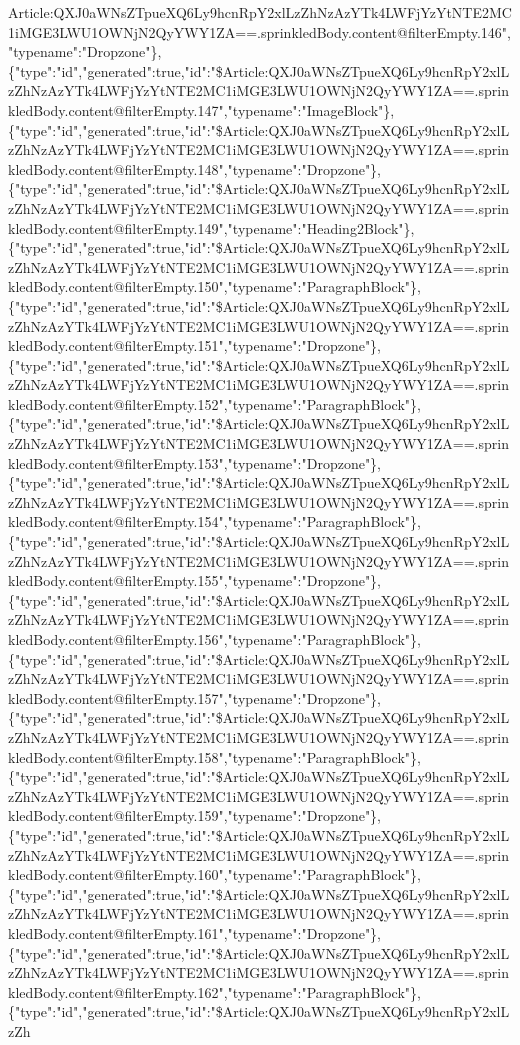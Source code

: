 Article:QXJ0aWNsZTpueXQ6Ly9hcnRpY2xlLzZhNzAzYTk4LWFjYzYtNTE2MC1iMGE3LWU1OWNjN2QyYWY1ZA==.sprinkledBody.content@filterEmpty.146","typename":"Dropzone"\},\{"type":"id","generated":true,"id":"\$Article:QXJ0aWNsZTpueXQ6Ly9hcnRpY2xlLzZhNzAzYTk4LWFjYzYtNTE2MC1iMGE3LWU1OWNjN2QyYWY1ZA==.sprinkledBody.content@filterEmpty.147","typename":"ImageBlock"\},\{"type":"id","generated":true,"id":"\$Article:QXJ0aWNsZTpueXQ6Ly9hcnRpY2xlLzZhNzAzYTk4LWFjYzYtNTE2MC1iMGE3LWU1OWNjN2QyYWY1ZA==.sprinkledBody.content@filterEmpty.148","typename":"Dropzone"\},\{"type":"id","generated":true,"id":"\$Article:QXJ0aWNsZTpueXQ6Ly9hcnRpY2xlLzZhNzAzYTk4LWFjYzYtNTE2MC1iMGE3LWU1OWNjN2QyYWY1ZA==.sprinkledBody.content@filterEmpty.149","typename":"Heading2Block"\},\{"type":"id","generated":true,"id":"\$Article:QXJ0aWNsZTpueXQ6Ly9hcnRpY2xlLzZhNzAzYTk4LWFjYzYtNTE2MC1iMGE3LWU1OWNjN2QyYWY1ZA==.sprinkledBody.content@filterEmpty.150","typename":"ParagraphBlock"\},\{"type":"id","generated":true,"id":"\$Article:QXJ0aWNsZTpueXQ6Ly9hcnRpY2xlLzZhNzAzYTk4LWFjYzYtNTE2MC1iMGE3LWU1OWNjN2QyYWY1ZA==.sprinkledBody.content@filterEmpty.151","typename":"Dropzone"\},\{"type":"id","generated":true,"id":"\$Article:QXJ0aWNsZTpueXQ6Ly9hcnRpY2xlLzZhNzAzYTk4LWFjYzYtNTE2MC1iMGE3LWU1OWNjN2QyYWY1ZA==.sprinkledBody.content@filterEmpty.152","typename":"ParagraphBlock"\},\{"type":"id","generated":true,"id":"\$Article:QXJ0aWNsZTpueXQ6Ly9hcnRpY2xlLzZhNzAzYTk4LWFjYzYtNTE2MC1iMGE3LWU1OWNjN2QyYWY1ZA==.sprinkledBody.content@filterEmpty.153","typename":"Dropzone"\},\{"type":"id","generated":true,"id":"\$Article:QXJ0aWNsZTpueXQ6Ly9hcnRpY2xlLzZhNzAzYTk4LWFjYzYtNTE2MC1iMGE3LWU1OWNjN2QyYWY1ZA==.sprinkledBody.content@filterEmpty.154","typename":"ParagraphBlock"\},\{"type":"id","generated":true,"id":"\$Article:QXJ0aWNsZTpueXQ6Ly9hcnRpY2xlLzZhNzAzYTk4LWFjYzYtNTE2MC1iMGE3LWU1OWNjN2QyYWY1ZA==.sprinkledBody.content@filterEmpty.155","typename":"Dropzone"\},\{"type":"id","generated":true,"id":"\$Article:QXJ0aWNsZTpueXQ6Ly9hcnRpY2xlLzZhNzAzYTk4LWFjYzYtNTE2MC1iMGE3LWU1OWNjN2QyYWY1ZA==.sprinkledBody.content@filterEmpty.156","typename":"ParagraphBlock"\},\{"type":"id","generated":true,"id":"\$Article:QXJ0aWNsZTpueXQ6Ly9hcnRpY2xlLzZhNzAzYTk4LWFjYzYtNTE2MC1iMGE3LWU1OWNjN2QyYWY1ZA==.sprinkledBody.content@filterEmpty.157","typename":"Dropzone"\},\{"type":"id","generated":true,"id":"\$Article:QXJ0aWNsZTpueXQ6Ly9hcnRpY2xlLzZhNzAzYTk4LWFjYzYtNTE2MC1iMGE3LWU1OWNjN2QyYWY1ZA==.sprinkledBody.content@filterEmpty.158","typename":"ParagraphBlock"\},\{"type":"id","generated":true,"id":"\$Article:QXJ0aWNsZTpueXQ6Ly9hcnRpY2xlLzZhNzAzYTk4LWFjYzYtNTE2MC1iMGE3LWU1OWNjN2QyYWY1ZA==.sprinkledBody.content@filterEmpty.159","typename":"Dropzone"\},\{"type":"id","generated":true,"id":"\$Article:QXJ0aWNsZTpueXQ6Ly9hcnRpY2xlLzZhNzAzYTk4LWFjYzYtNTE2MC1iMGE3LWU1OWNjN2QyYWY1ZA==.sprinkledBody.content@filterEmpty.160","typename":"ParagraphBlock"\},\{"type":"id","generated":true,"id":"\$Article:QXJ0aWNsZTpueXQ6Ly9hcnRpY2xlLzZhNzAzYTk4LWFjYzYtNTE2MC1iMGE3LWU1OWNjN2QyYWY1ZA==.sprinkledBody.content@filterEmpty.161","typename":"Dropzone"\},\{"type":"id","generated":true,"id":"\$Article:QXJ0aWNsZTpueXQ6Ly9hcnRpY2xlLzZhNzAzYTk4LWFjYzYtNTE2MC1iMGE3LWU1OWNjN2QyYWY1ZA==.sprinkledBody.content@filterEmpty.162","typename":"ParagraphBlock"\},\{"type":"id","generated":true,"id":"\$Article:QXJ0aWNsZTpueXQ6Ly9hcnRpY2xlLzZh